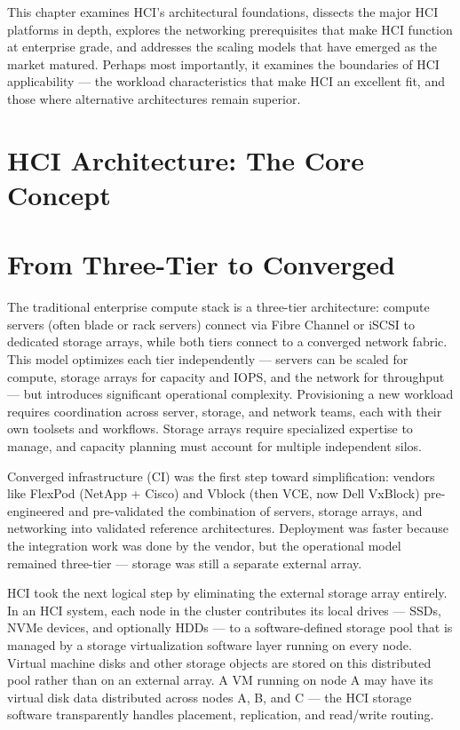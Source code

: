 This chapter examines HCI's architectural foundations, dissects the major HCI platforms in depth, explores the networking prerequisites that make HCI function at enterprise grade, and addresses the scaling models that have emerged as the market matured. Perhaps most importantly, it examines the boundaries of HCI applicability --- the workload characteristics that make HCI an excellent fit, and those where alternative architectures remain superior.

\section{HCI Architecture: The Core Concept}
\section{From Three-Tier to Converged}
The traditional enterprise compute stack is a three-tier architecture: compute servers (often blade or rack servers) connect via Fibre Channel or iSCSI to dedicated storage arrays, while both tiers connect to a converged network fabric. This model optimizes each tier independently --- servers can be scaled for compute, storage arrays for capacity and IOPS, and the network for throughput --- but introduces significant operational complexity. Provisioning a new workload requires coordination across server, storage, and network teams, each with their own toolsets and workflows. Storage arrays require specialized expertise to manage, and capacity planning must account for multiple independent silos.

Converged infrastructure (CI) was the first step toward simplification: vendors like FlexPod (NetApp + Cisco) and Vblock (then VCE, now Dell VxBlock) pre-engineered and pre-validated the combination of servers, storage arrays, and networking into validated reference architectures. Deployment was faster because the integration work was done by the vendor, but the operational model remained three-tier --- storage was still a separate external array.

HCI took the next logical step by eliminating the external storage array entirely. In an HCI system, each node in the cluster contributes its local drives --- SSDs, NVMe devices, and optionally HDDs --- to a software-defined storage pool that is managed by a storage virtualization software layer running on every node. Virtual machine disks and other storage objects are stored on this distributed pool rather than on an external array. A VM running on node A may have its virtual disk data distributed across nodes A, B, and C --- the HCI storage software transparently handles placement, replication, and read/write routing.

